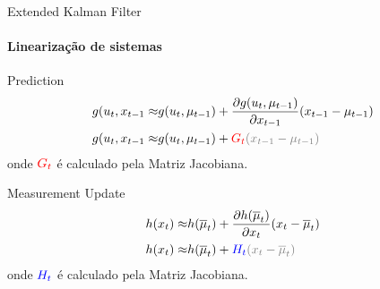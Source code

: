 \documentclass[aspectratio=169]{beamer}
\begin{document}
\begin{frame}[c]{Extended Kalman Filter}
    \framesubtitle{Linearização de sistemas}
        \begin{block}{Prediction}
            \begin{equation*}
                \begin{split}
                    g(u_t, x_{t-1} \approx & g(u_t, \mu_{t-1}) + \frac{\partial g(u_t, \mu_{t-1}) }{\partial x_{t-1}}(x_{t-1}-\mu_{t-1}) \\
                    g(u_t, x_{t-1} \approx & g(u_t, \mu_{t-1}) + \color{red}{G_t}\color{gray}{(x_{t-1}-\mu_{t-1})}
                \end{split}
            \end{equation*}
            onde $\color{red}G_t$ é calculado pela Matriz Jacobiana.
        \end{block}


        \begin{block}{Measurement Update}
            \begin{equation*}
                \begin{split}
                    h(x_t) \approx & h(\overline{\mu}_t) + \frac{\partial h(\overline{\mu}_t) }{\partial x_{t}}(x_{t}-\overline{\mu}_{t}) \\
                    h(x_t) \approx & h(\overline{\mu}_t) + \color{blue}{H_t}\color{gray}{(x_{t}-\overline{\mu}_{t})}
                \end{split}
            \end{equation*}
            onde $\color{blue}H_t$ é calculado pela Matriz Jacobiana.
        \end{block}

\end{frame}
\end{document}
